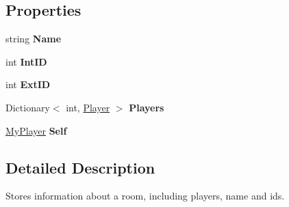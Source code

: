 \subsection*{\-Properties}
\begin{DoxyCompactItemize}
\item 
\hypertarget{classSharpenguin_1_1Data_1_1PenguinRoom_ad18150861add37e0b379e1d1ad1dce08}{string {\bfseries \-Name}}\label{classSharpenguin_1_1Data_1_1PenguinRoom_ad18150861add37e0b379e1d1ad1dce08}

\item 
\hypertarget{classSharpenguin_1_1Data_1_1PenguinRoom_a223a3cbc592600dee66427838e926956}{int {\bfseries \-Int\-I\-D}}\label{classSharpenguin_1_1Data_1_1PenguinRoom_a223a3cbc592600dee66427838e926956}

\item 
\hypertarget{classSharpenguin_1_1Data_1_1PenguinRoom_a4ce2da1fa1e871bd07dd6fe2fa82d6c1}{int {\bfseries \-Ext\-I\-D}}\label{classSharpenguin_1_1Data_1_1PenguinRoom_a4ce2da1fa1e871bd07dd6fe2fa82d6c1}

\item 
\hypertarget{classSharpenguin_1_1Data_1_1PenguinRoom_a7d3891539bef624fa318fee5b661bcef}{\-Dictionary$<$ int, \hyperlink{classSharpenguin_1_1Data_1_1Player}{\-Player} $>$ {\bfseries \-Players}}\label{classSharpenguin_1_1Data_1_1PenguinRoom_a7d3891539bef624fa318fee5b661bcef}

\item 
\hypertarget{classSharpenguin_1_1Data_1_1PenguinRoom_af65781b1023d9b172ccecda1bcd4baa3}{\hyperlink{classSharpenguin_1_1Data_1_1MyPlayer}{\-My\-Player} {\bfseries \-Self}}\label{classSharpenguin_1_1Data_1_1PenguinRoom_af65781b1023d9b172ccecda1bcd4baa3}

\end{DoxyCompactItemize}


\subsection{\-Detailed \-Description}
\-Stores information about a room, including players, name and ids. 

